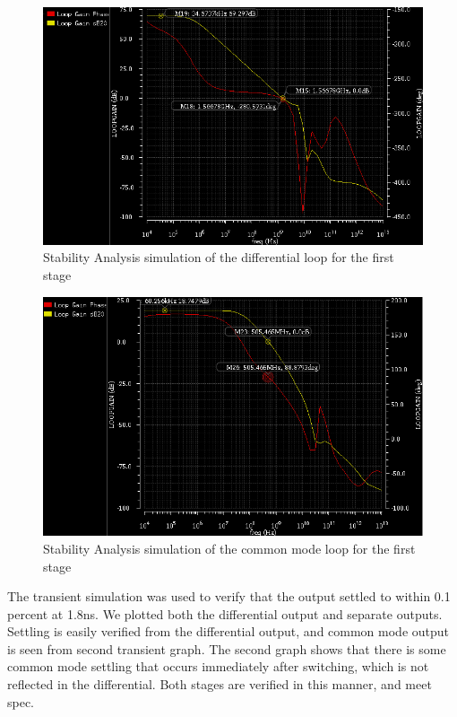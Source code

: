 \documentclass[conference]{IEEEtran}
\begin{document}
\begin{figure}[h]
\centering
\includegraphics[width=\linewidth]{piktures/st2_diff_ac}
\caption{Stability Analysis simulation of the differential loop for the first stage}
\label{stage1-tran}
\end{figure}

\begin{figure}[h]
\centering
\includegraphics[width=\linewidth]{piktures/st2_cm_ac}
\caption{Stability Analysis simulation of the common mode loop for the first stage}
\label{stage1-tran}
\end{figure}


The transient simulation was used to verify that the output settled to within 0.1 percent at 1.8ns. We plotted both the differential output and separate outputs. Settling is easily verified from the differential output, and common mode output is seen from second transient graph. The second graph shows that there is some common mode settling that occurs immediately after switching, which is not reflected in the differential. Both stages are verified in this manner, and meet spec.
\end{document}
